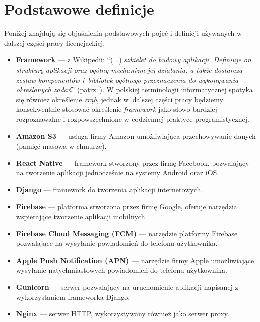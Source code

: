 \documentclass[licencjacka]{pracamgr}
\begin{document}
\chapter{Podstawowe definicje}\label{r:definicje}

Poniżej znajdują się objaśnienia podstawowych pojęć i definicji używanych w dalszej części pracy licencjackiej.

\begin{itemize}
\setlength\itemsep{-0.2em}

\item \textbf{Framework} --- z Wikipedii: ``(...) \textit{szkielet do budowy aplikacji. Definiuje on strukturę aplikacji oraz ogólny mechanizm jej działania, a także dostarcza zestaw komponentów i~bibliotek ogólnego przeznaczenia do wykonywania określonych zadań}'' (patrz~\cite{framework}). W polskiej terminologii informatycznej spotyka się również określenie \textit{zrąb}, jednak w~dalszej części pracy będziemy konsekwentnie stosować określenie \textit{framework} jako słowo bardziej rozpoznawalne i rozpowszechnione w codziennej praktyce programistycznej.

\item \textbf{Amazon S3} --- usługa firmy Amazon umożliwiająca przechowywanie danych (pamięć masowa w chmurze).

\item \textbf{React Native} --- framework stworzony przez firmę Facebook, pozwalający na tworzenie
aplikacji jednocześnie na systemy Android oraz iOS.

\item \textbf{Django} --- framework do tworzenia aplikacji internetowych.

\item \textbf{Firebase} --- platforma stworzona przez firmę Google, oferuje narzędzia wspierające tworzenie aplikacji mobilnych.

\item \textbf{Firebase Cloud Messaging (FCM)} --- narzędzie platformy Firebase pozwalające na wysyłanie powiadomień do telefonu użytkownika.

\item \textbf{Apple Push Notification (APN)} --- narzędzie firmy Apple umożliwiające wysyłanie natychmiastowych powiadomień do telefonu użytkownika.

\item \textbf{Gunicorn} --- serwer pozwalający na uruchomienie aplikacji napisanej z wykorzystaniem frameworka Django.

\item \textbf{Nginx} --- serwer HTTP, wykorzystywany również jako serwer proxy.


\end{itemize}
\end{document}
